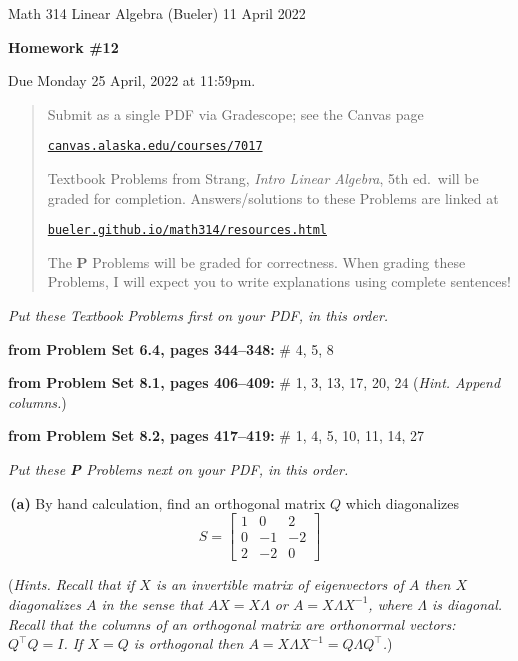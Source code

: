 \documentclass[12pt]{amsart}
\newcommand{\prob}[1]{\bigskip\noindent{\large \textbf{#1.}}\quad }
\newcommand{\probset}[2]{\bigskip\noindent\textbf{from Problem Set #1, pages #2:}\quad }
\newcommand{\ppart}[1]{\,\textbf{(#1)}\quad }
\begin{document}
\scriptsize \noindent Math 314 Linear Algebra (Bueler) \hfill 11 April 2022
\normalsize\medskip

\Large
\centerline{\textbf{Homework \#12}}

\bigskip
\large
\centerline{Due Monday 25 April, 2022 at 11:59pm.}

\normalsize
\bigskip
\begin{quote}
\medskip
\noindent Submit as a single PDF via Gradescope; see the Canvas page

\href{https://canvas.alaska.edu/courses/7017}{\texttt{canvas.alaska.edu/courses/7017}}

\noindent Textbook Problems from Strang, \emph{Intro Linear Algebra}, 5th ed.~will be graded for completion.  Answers/solutions to these Problems are linked at

\href{https://bueler.github.io/math314/resources.html}{\texttt{bueler.github.io/math314/resources.html}}

\noindent The \textbf{P} Problems will be graded for correctness.  When grading these Problems, I will expect you to write explanations using complete sentences!
\end{quote}
\medskip

\thispagestyle{empty}

\noindent \hrulefill

\noindent \emph{Put these Textbook Problems first on your PDF, in this order.}

\probset{6.4}{344--348} \# 4, 5, 8

\probset{8.1}{406--409} \# 1, 3, 13, 17, 20, 24 (\emph{Hint. Append columns.})

\probset{8.2}{417--419} \# 1, 4, 5, 10, 11, 14, 27

\bigskip
\noindent \hrulefill

\noindent \emph{Put these \textbf{P} Problems next on your PDF, in this order.}

\prob{P57}  \ppart{a} By hand calculation, find an orthogonal matrix $Q$ which diagonalizes
    $$S = \begin{bmatrix} 1 & 0 & 2 \\ 0 & -1 & -2 \\ 2 & -2 & 0 \end{bmatrix}$$

\medskip
\noindent (\emph{Hints.  Recall that if $X$ is an invertible matrix of eigenvectors of $A$ then $X$ diagonalizes $A$ in the sense that $AX=X\Lambda$ or $A=X \Lambda X^{-1}$, where $\Lambda$ is diagonal.  Recall that the columns of an orthogonal matrix are orthonormal vectors: $Q^\top Q=I$.  If $X=Q$ is orthogonal then $A=X \Lambda X^{-1}=Q \Lambda Q^\top$.})
\end{document}
